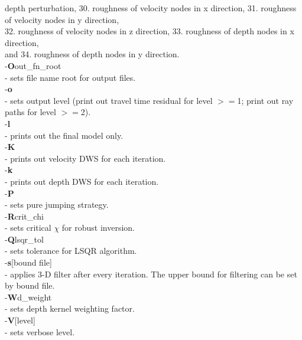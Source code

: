 \documentclass[twoside,final,onecolumn]{article}
\newcommand{\forceindent}{\leavevmode{\parindent=1em\indent}}
\begin{document}
\forceindent\forceindent depth perturbation, 30. roughness of velocity nodes in x direction, 31. roughness of velocity nodes in y direction,\\
\forceindent\forceindent 32. roughness of velocity nodes in z direction, 33. roughness of depth nodes in x direction,\\
\forceindent\forceindent and 34. roughness of depth nodes in y direction.\\[6pt]
\forceindent -\textbf{O}out\_fn\_root \\
\forceindent\forceindent - sets file name root for output files.\\[6pt]
\forceindent -\textbf{o} \\
\forceindent\forceindent - sets output level (print out travel time residual for level $>=$1; print out ray paths for level $>=$2).\\[6pt]
\forceindent -\textbf{l} \\
\forceindent\forceindent - prints out the final model only.\\[6pt]
\forceindent -\textbf{K} \\
\forceindent\forceindent - prints out velocity DWS for each iteration.\\[6pt]
\forceindent -\textbf{k} \\
\forceindent\forceindent - prints out depth DWS for each iteration.\\[6pt]
\forceindent -\textbf{P} \\
\forceindent\forceindent - sets pure jumping strategy.\\[6pt]
\forceindent -\textbf{R}crit\_chi \\
\forceindent\forceindent - sets critical $\chi$ for robust inversion.\\[6pt]
\forceindent -\textbf{Q}lsqr\_tol \\
\forceindent\forceindent - sets tolerance for LSQR algorithm.\\[6pt]
\forceindent -\textbf{s}[bound file] \\
\forceindent\forceindent - applies 3-D filter after every iteration. The upper bound for filtering can be set by bound file.\\[6pt]
\forceindent -\textbf{W}d\_weight \\
\forceindent\forceindent - sets depth kernel weighting factor.\\[6pt]
\forceindent -\textbf{V}[level] \\
\forceindent\forceindent - sets verbose level.\\[6pt]
\end{document}
